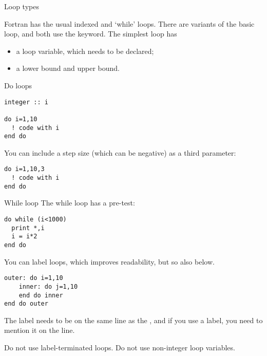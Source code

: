 
 {Loop types}

Fortran has the usual indexed and `while' loops. There are variants of the
basic loop, and both use the  keyword. The simplest loop has
\begin{itemize}
\item a loop variable, which needs to be declared;
\item a lower bound and upper bound.
\end{itemize}

\begin{block}{Do loops}
  \label{sl:doloop}
\begin{verbatim}
integer :: i

do i=1,10
  ! code with i
end do
\end{verbatim}

You can include a step size (which can be negative) as a third parameter:
\begin{verbatim}
do i=1,10,3
  ! code with i
end do
\end{verbatim}
\end{block}

\begin{block}{While loop}
  \label{sl:whilef}
  The while loop has a pre-test:
\begin{verbatim}
do while (i<1000)
  print *,i
  i = i*2
end do
\end{verbatim}
\end{block}

You can label loops, which improves readability, but so also below.
\begin{verbatim}
outer: do i=1,10
    inner: do j=1,10
    end do inner
end do outer
\end{verbatim}
The label needs to be on the same line as the , and if you use a
label, you need to mention it on the  line.

\begin{f77note}
  Do not use label-terminated loops. Do not use non-integer loop variables.
\end{f77note}

